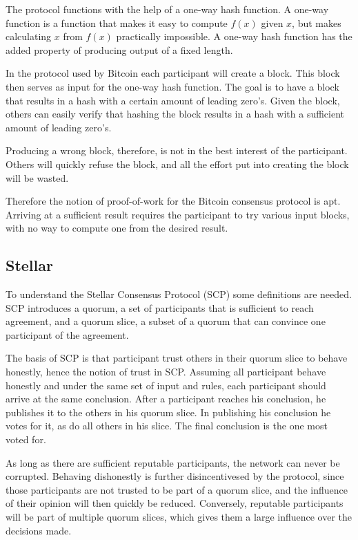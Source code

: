 The protocol functions with the help of a one-way hash function. A one-way function is a function that makes it easy to compute $f(x)$ given $x$, but makes calculating $x$ from $f(x)$ practically impossible. A one-way hash function has the added property of producing output of a fixed length.

In the protocol used by Bitcoin each participant will create a block. This block then serves as input for the one-way hash function. The goal is to have a block that results in a hash with a certain amount of leading zero's. Given the block, others can easily verify that hashing the block results in a hash with a sufficient amount of leading zero's.

Producing a wrong block, therefore, is not in the best interest of the participant. Others will quickly refuse the block, and all the effort put into creating the block will be wasted.

Therefore the notion of proof-of-work for the Bitcoin consensus protocol is apt. Arriving at a sufficient result requires the participant to try various input blocks, with no way to compute one from the desired result.

\subsection{Stellar}
To understand the Stellar Consensus Protocol \cite{StellarConsensus} (SCP) some definitions are needed. SCP introduces a quorum, a set of participants that is sufficient to reach agreement, and a quorum slice, a subset of a quorum that can convince one participant of the agreement.

The basis of SCP is that participant trust others in their quorum slice to behave honestly, hence the notion of trust in SCP. Assuming all participant behave honestly and under the same set of input and rules, each participant should arrive at the same conclusion. After a participant reaches his conclusion, he publishes it to the others in his quorum slice. In publishing his conclusion he votes for it, as do all others in his slice. The final conclusion is the one most voted for.

As long as there are sufficient reputable participants, the network can never be corrupted. Behaving dishonestly is further disincentivesed by the protocol, since those participants are not trusted to be part of a quorum slice, and the influence of their opinion will then quickly be reduced. Conversely, reputable participants will be part of multiple quorum slices, which gives them a large influence over the decisions made.

